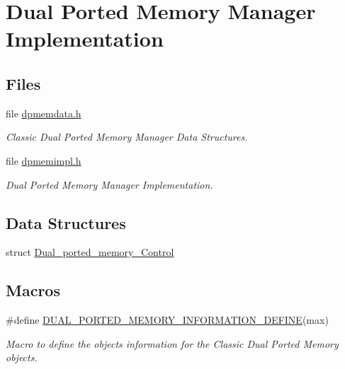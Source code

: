 \hypertarget{group__ClassicDPMEMImpl}{}\section{Dual Ported Memory Manager Implementation}
\label{group__ClassicDPMEMImpl}
\subsection*{Files}
\begin{DoxyCompactItemize}
\item 
file \mbox{\hyperlink{dpmemdata_8h}{dpmemdata.\+h}}
\begin{DoxyCompactList}\small\item\em Classic Dual Ported Memory Manager Data Structures. \end{DoxyCompactList}\item 
file \mbox{\hyperlink{dpmemimpl_8h}{dpmemimpl.\+h}}
\begin{DoxyCompactList}\small\item\em Dual Ported Memory Manager Implementation. \end{DoxyCompactList}\end{DoxyCompactItemize}
\subsection*{Data Structures}
\begin{DoxyCompactItemize}
\item 
struct \mbox{\hyperlink{structDual__ported__memory__Control}{Dual\+\_\+ported\+\_\+memory\+\_\+\+Control}}
\end{DoxyCompactItemize}
\subsection*{Macros}
\begin{DoxyCompactItemize}
\item 
\#define \mbox{\hyperlink{group__ClassicDPMEMImpl_ga9dd577ed3847bfc0a6c91f9758d0bf43}{D\+U\+A\+L\+\_\+\+P\+O\+R\+T\+E\+D\+\_\+\+M\+E\+M\+O\+R\+Y\+\_\+\+I\+N\+F\+O\+R\+M\+A\+T\+I\+O\+N\+\_\+\+D\+E\+F\+I\+NE}}(max)
\begin{DoxyCompactList}\small\item\em Macro to define the objects information for the Classic Dual Ported Memory objects. \end{DoxyCompactList}\end{DoxyCompactItemize}
